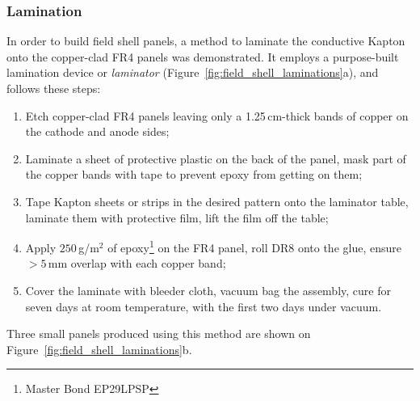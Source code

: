\documentclass[a4paper,12pt]{article}
\newcommand{\DR}{DR8}
\begin{document}
\subsubsection{Lamination} 
\label{sec:lamination}
In order to build field shell panels, a method to laminate the conductive Kapton onto the copper-clad FR4 panels was demonstrated. It employs a purpose-built lamination device or \textit{laminator} (Figure~\ref{fig:field_shell_laminations}a), and follows these steps:
\begin{enumerate}
	\item Etch copper-clad FR4 panels leaving only a 1.25\,cm-thick bands of copper on the cathode and anode sides;
	\item Laminate a sheet of protective plastic on the back of the panel, mask part of the copper bands with tape to prevent epoxy from getting on them;
	\item Tape Kapton sheets or strips in the desired pattern onto the laminator table, laminate them with protective film, lift the film off the table;
	\item Apply $250$\,g/m$^2$ of epoxy\footnote{Master Bond EP29LPSP} on the FR4 panel, roll {\DR} onto the glue, ensure $>5\,$mm overlap with each copper band;
	\item Cover the laminate with bleeder cloth, vacuum bag the assembly, cure for seven days at room temperature, with the first two days under vacuum.
\end{enumerate}
Three small panels produced using this method are shown on Figure~\ref{fig:field_shell_laminations}b.
\end{document}

